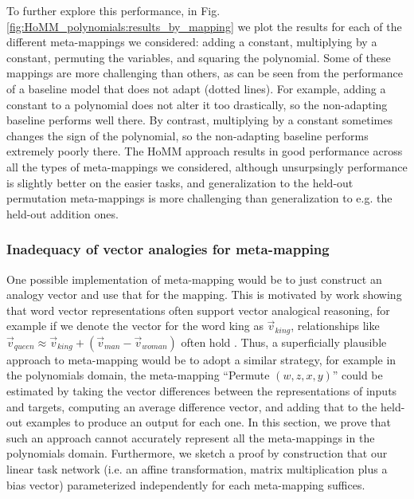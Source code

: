 To further explore this performance, in Fig. \ref{fig:HoMM_polynomials:results_by_mapping} we plot the results for each of the different meta-mappings we considered: adding a constant, multiplying by a constant, permuting the variables, and squaring the polynomial. Some of these mappings are more challenging than others, as can be seen from the performance of a baseline model that does not adapt (dotted lines). For example, adding a constant to a polynomial does not alter it too drastically, so the non-adapting baseline performs well there. By contrast, multiplying by a constant sometimes changes the sign of the polynomial, so the non-adapting baseline performs extremely poorly there. The HoMM approach results in good performance across all the types of meta-mappings we considered, although unsurpsingly performance is slightly better on the easier tasks, and generalization to the held-out permutation meta-mappings is more challenging than generalization to e.g. the held-out addition ones. 


\subsubsection{Inadequacy of vector analogies for meta-mapping} \label{sec:HoMM:vector_analogies_inadequate}

One possible implementation of meta-mapping would be to just construct an analogy vector and use that for the mapping. This is motivated by work showing that word vector representations often support vector analogical reasoning, for example if we denote the vector for the word king as \(\vec{v}_{king}\), relationships like \(\vec{v}_{queen} \approx \vec{v}_{king} + \left(\vec{v}_{man} - \vec{v}_{woman} \right)\) often hold \citep{Mikolov2013}. Thus, a superficially plausible approach to meta-mapping would be to adopt a similar strategy, for example in the polynomials domain, the meta-mapping ``Permute \((w, z, x, y)\)'' could be estimated by taking the vector differences between the representations of inputs and targets, computing an average difference vector, and adding that to the held-out examples to produce an output for each one. In this section, we prove that such an approach cannot accurately represent all the meta-mappings in the polynomials domain. Furthermore, we sketch a proof by construction that our linear task network (i.e. an affine transformation, matrix multiplication plus a bias vector) parameterized independently for each meta-mapping suffices.

